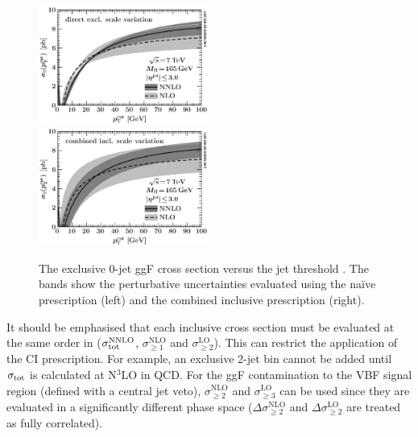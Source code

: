 \begin{figure}[t]
	\includegraphics[width=0.495\textwidth]{tex/signal/sigma0_naive}
	\hfill
	\includegraphics[width=0.495\textwidth]{tex/signal/sigma0_CI}
	\caption{The exclusive 0-jet ggF cross section versus the jet \pt threshold 
	\cite{YR2}. The bands show the perturbative uncertainties evaluated using the 
	na\"{i}ve prescription (left) and the combined inclusive prescription (right).}
	\label{fig:ggF:ci}
\end{figure}

It should be emphasised that each inclusive cross section must be evaluated at the same 
order in \alphaS (\eg $\sigma_{\text{tot}}^{\text{NNLO}}$, $\sigma_{\geq1}^{\text{NLO}}$ and 
$\sigma_{\geq2}^{\text{LO}}$). This can restrict the application of the CI prescription. 
For example, an exclusive 2-jet bin cannot be added until $\sigma_{\text{tot}}$ is calculated 
at N$^3$LO in QCD. For the ggF contamination to the VBF signal region (defined with a 
central jet veto), $\sigma_{\geq2}^{\text{NLO}}$ and $\sigma_{\geq3}^{\text{LO}}$ can be 
used since they are evaluated in a significantly different phase space 
($\Delta\sigma_{\geq2}^{\text{NLO}}$ and $\Delta\sigma_{\geq2}^{\text{LO}}$ are treated as 
fully correlated).

